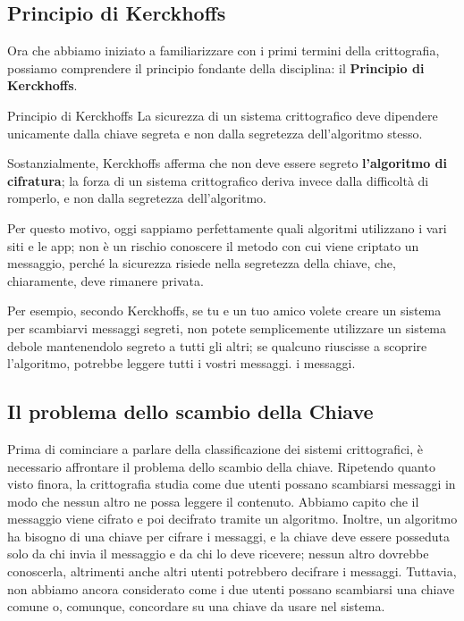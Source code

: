\documentclass{report}
\begin{document}
\subsection{Principio di Kerckhoffs}

Ora che abbiamo iniziato a familiarizzare con i primi termini della crittografia, possiamo comprendere il principio fondante della disciplina: il \textbf{Principio di Kerckhoffs}.


\begin{teorema}{Principio di Kerckhoffs}{}
La sicurezza di un sistema crittografico deve dipendere unicamente dalla chiave segreta e non dalla segretezza dell’algoritmo stesso.

\end{teorema}

Sostanzialmente, Kerckhoffs afferma che non deve essere segreto \textbf{l’algoritmo di cifratura}; la forza di un sistema crittografico deriva invece dalla difficoltà di romperlo, e non dalla segretezza dell’algoritmo.


Per questo motivo, oggi sappiamo perfettamente quali algoritmi utilizzano i vari siti e le app; non è un rischio conoscere il metodo con cui viene criptato un messaggio, perché la sicurezza risiede nella segretezza della chiave, che, chiaramente, deve rimanere privata. 


Per esempio, secondo Kerckhoffs, se tu e un tuo amico volete creare un sistema per scambiarvi messaggi segreti, non potete semplicemente utilizzare un sistema debole mantenendolo segreto a tutti gli altri; se qualcuno riuscisse a scoprire l’algoritmo, potrebbe leggere tutti i vostri messaggi. i messaggi.



\newpage

\subsection{Il problema dello scambio della Chiave}

Prima di cominciare a parlare della classificazione dei sistemi crittografici, è necessario affrontare il problema dello scambio della chiave. Ripetendo quanto visto finora, la crittografia studia come due utenti possano scambiarsi messaggi in modo che nessun altro ne possa leggere il contenuto. Abbiamo capito che il messaggio viene cifrato e poi decifrato tramite un algoritmo. Inoltre, un algoritmo ha bisogno di una chiave per cifrare i messaggi, e la chiave deve essere posseduta solo da chi invia il messaggio e da chi lo deve ricevere; nessun altro dovrebbe conoscerla, altrimenti anche altri utenti potrebbero decifrare i messaggi. Tuttavia, non abbiamo ancora considerato come i due utenti possano scambiarsi una chiave comune o, comunque, concordare su una chiave da usare nel sistema.
\end{document}
